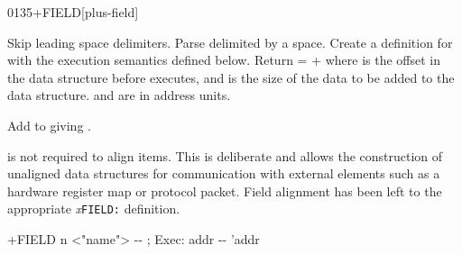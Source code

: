 
\begin{worddef}{0135}{+FIELD}[plus-field]%
\item {}

	Skip leading space delimiters.  Parse  delimited
	by a space.  Create a definition for  with the
	execution semantics defined below.  Return  =
	 +  where  is the offset
	in the data structure before  executes, and
	 is the size of the data to be added to the data
	structure.  and  are in address units.

\execute[name]

	Add  to  giving .


	\begin{rationale} %
		 is not required to align items.  This is
		deliberate and allows the construction of unaligned data
		structures for communication with external elements such
		as a hardware register map or protocol packet.
		Field alignment has been left to the appropriate
		\emph{x}\texttt{FIELD:} definition.
	\end{rationale}

	\begin{implement} %

		\word{:} +FIELD\tab{} n <"name"> -{}- ; Exec: addr -{}- 'addr \\
		\tab {}  \word{,} \word{+} \\
		\tab {}  \word{+} \\
		\word{;}
	\end{implement}
\end{worddef}


